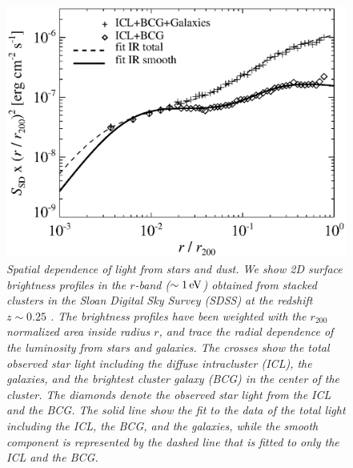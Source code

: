 \documentclass[10pt,aps,pra,reprint,amsmath,amsfonts,amssymb,showpacs]{revtex4-1}
\newcommand{\ev}{\rm{eV}}
\newcommand{\rvir}{r_{200}}
\begin{document}
\begin{figure}%
 \includegraphics[width=0.99\columnwidth]{figures/SB.photon.eps}
\caption{\it Spatial dependence of light from stars and dust. We show
  2D surface brightness profiles in the $r$-band ($\sim 1\,\ev$)
  obtained from stacked clusters in the Sloan Digital Sky Survey
  (SDSS) at the redshift $z \sim 0.25$ \cite{2005MNRAS.358..949Z}. The
  brightness profiles have been weighted with the $\rvir$ normalized
  area inside radius $r$, and trace the radial dependence of the
  luminosity from stars and galaxies. The crosses show the total
  observed star light including the diffuse intracluster (ICL), the
  galaxies, and the brightest cluster galaxy (BCG) in the center of
  the cluster. The diamonds denote the observed star light from the
  ICL and the BCG. The solid line show the fit to the data of the
  total light including the ICL, the BCG, and the galaxies, while the
  smooth component is represented by the dashed line that is fitted to
  only the ICL and the BCG.}
 \label{fig:SD_spatial}
\end{figure}
\end{document}
